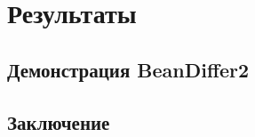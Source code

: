 \documentclass{beamer}
\begin{document}
\section{Результаты}

\subsection{Демонстрация BeanDiffer2}

\subsection{Заключение}
\end{document}
